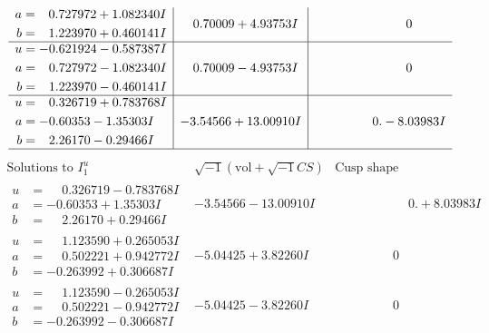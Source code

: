 \documentclass[1p]{elsarticle_modified}
\theoremstyle{definition}
\newcommand{\I}{\sqrt{-1}}
\begin{document}
$$\begin{array}{c|c|c}
\begin{aligned}
a &= \phantom{-}0.727972 + 1.082340 I \\
b &= \phantom{-}1.223970 + 0.460141 I\end{aligned}
 & \phantom{-}0.70009 + 4.93753 I & \phantom{-0.000000 } 0 \\ \hline\begin{aligned}
u &= -0.621924 - 0.587387 I \\
a &= \phantom{-}0.727972 - 1.082340 I \\
b &= \phantom{-}1.223970 - 0.460141 I\end{aligned}
 & \phantom{-}0.70009 - 4.93753 I & \phantom{-0.000000 } 0 \\ \hline\begin{aligned}
u &= \phantom{-}0.326719 + 0.783768 I \\
a &= -0.60353 - 1.35303 I \\
b &= \phantom{-}2.26170 - 0.29466 I\end{aligned}
 & -3.54566 + 13.00910 I & \phantom{-0.000000 } 0. - 8.03983 I\\
 \hline 
 \end{array}$$\newpage$$\begin{array}{c|c|c}  
\text{Solutions to }I^u_{1}& \I (\text{vol} + \sqrt{-1}CS) & \text{Cusp shape}\\
 \hline 
\begin{aligned}
u &= \phantom{-}0.326719 - 0.783768 I \\
a &= -0.60353 + 1.35303 I \\
b &= \phantom{-}2.26170 + 0.29466 I\end{aligned}
 & -3.54566 - 13.00910 I & \phantom{-0.000000 -}0. + 8.03983 I \\ \hline\begin{aligned}
u &= \phantom{-}1.123590 + 0.265053 I \\
a &= \phantom{-}0.502221 + 0.942772 I \\
b &= -0.263992 + 0.306687 I\end{aligned}
 & -5.04425 + 3.82260 I & \phantom{-0.000000 } 0 \\ \hline\begin{aligned}
u &= \phantom{-}1.123590 - 0.265053 I \\
a &= \phantom{-}0.502221 - 0.942772 I \\
b &= -0.263992 - 0.306687 I\end{aligned}
 & -5.04425 - 3.82260 I & \phantom{-0.000000 } 0 \\ \hline\begin{aligned}

\end{aligned}
\end{array}$$
\end{document}
